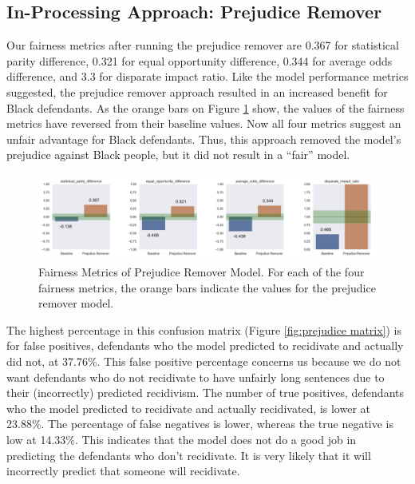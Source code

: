 \documentclass[water,article,submit,moreauthors,pdftex]{mdpi}
\begin{document}
\hypertarget{in-processing-approach-prejudice-remover}{%
\subsection{In-Processing Approach: Prejudice
Remover}\label{in-processing-approach-prejudice-remover}}

Our fairness metrics after running the prejudice remover are 0.367 for
statistical parity difference, 0.321 for equal opportunity difference,
0.344 for average odds difference, and 3.3 for disparate impact ratio.
Like the model performance metrics suggested, the prejudice remover
approach resulted in an increased benefit for Black defendants. As the
orange bars on Figure \ref{fig:prejudice metrics} show, the values of
the fairness metrics have reversed from their baseline values. Now all
four metrics suggest an unfair advantage for Black defendants. Thus,
this approach removed the model's prejudice against Black people, but it
did not result in a ``fair'' model.

\begin{figure}

{\centering \includegraphics[width=1\linewidth]{../images/prejudice_remover_metrics} 

}

\caption{Fairness Metrics of Prejudice Remover Model. For each of the four fairness metrics, the orange bars indicate the values for the prejudice remover model.}\label{fig:prejudice metrics}
\end{figure}

The highest percentage in this confusion matrix (Figure
\ref{fig:prejudice matrix}) is for false positives, defendants who the
model predicted to recidivate and actually did not, at 37.76\%. This
false positive percentage concerns us because we do not want defendants
who do not recidivate to have unfairly long sentences due to their
(incorrectly) predicted recidivism. The number of true positives,
defendants who the model predicted to recidivate and actually
recidivated, is lower at 23.88\%. The percentage of false negatives is
lower, whereas the true negative is low at 14.33\%. This indicates that
the model does not do a good job in predicting the defendants who don't
recidivate. It is very likely that it will incorrectly predict that
someone will recidivate.
\end{document}
